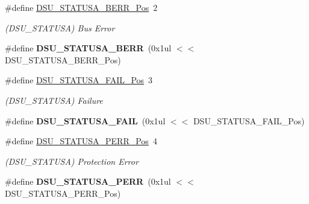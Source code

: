 \begin{DoxyCompactItemize}
\item 
\hypertarget{group___s_a_m_l21___d_s_u_gafa02b78e838184c6f5a895f0f16c213a}{}\#define \hyperlink{group___s_a_m_l21___d_s_u_gafa02b78e838184c6f5a895f0f16c213a}{D\+S\+U\+\_\+\+S\+T\+A\+T\+U\+S\+A\+\_\+\+B\+E\+R\+R\+\_\+\+Pos}~2\label{group___s_a_m_l21___d_s_u_gafa02b78e838184c6f5a895f0f16c213a}

\begin{DoxyCompactList}\small\item\em (D\+S\+U\+\_\+\+S\+T\+A\+T\+U\+S\+A) Bus Error \end{DoxyCompactList}\item 
\hypertarget{group___s_a_m_l21___d_s_u_ga74dbd3779decac8f909b6f2fde2df451}{}\#define {\bfseries D\+S\+U\+\_\+\+S\+T\+A\+T\+U\+S\+A\+\_\+\+B\+E\+R\+R}~(0x1ul $<$$<$ D\+S\+U\+\_\+\+S\+T\+A\+T\+U\+S\+A\+\_\+\+B\+E\+R\+R\+\_\+\+Pos)\label{group___s_a_m_l21___d_s_u_ga74dbd3779decac8f909b6f2fde2df451}

\item 
\hypertarget{group___s_a_m_l21___d_s_u_ga379cd81ca596d64fff4cdf4cd0642e9d}{}\#define \hyperlink{group___s_a_m_l21___d_s_u_ga379cd81ca596d64fff4cdf4cd0642e9d}{D\+S\+U\+\_\+\+S\+T\+A\+T\+U\+S\+A\+\_\+\+F\+A\+I\+L\+\_\+\+Pos}~3\label{group___s_a_m_l21___d_s_u_ga379cd81ca596d64fff4cdf4cd0642e9d}

\begin{DoxyCompactList}\small\item\em (D\+S\+U\+\_\+\+S\+T\+A\+T\+U\+S\+A) Failure \end{DoxyCompactList}\item 
\hypertarget{group___s_a_m_l21___d_s_u_gacfa2c317afc818826c5ee60f7fd5b06a}{}\#define {\bfseries D\+S\+U\+\_\+\+S\+T\+A\+T\+U\+S\+A\+\_\+\+F\+A\+I\+L}~(0x1ul $<$$<$ D\+S\+U\+\_\+\+S\+T\+A\+T\+U\+S\+A\+\_\+\+F\+A\+I\+L\+\_\+\+Pos)\label{group___s_a_m_l21___d_s_u_gacfa2c317afc818826c5ee60f7fd5b06a}

\item 
\hypertarget{group___s_a_m_l21___d_s_u_ga2d5f7f64db290d822709d358b9d8baf6}{}\#define \hyperlink{group___s_a_m_l21___d_s_u_ga2d5f7f64db290d822709d358b9d8baf6}{D\+S\+U\+\_\+\+S\+T\+A\+T\+U\+S\+A\+\_\+\+P\+E\+R\+R\+\_\+\+Pos}~4\label{group___s_a_m_l21___d_s_u_ga2d5f7f64db290d822709d358b9d8baf6}

\begin{DoxyCompactList}\small\item\em (D\+S\+U\+\_\+\+S\+T\+A\+T\+U\+S\+A) Protection Error \end{DoxyCompactList}\item 
\hypertarget{group___s_a_m_l21___d_s_u_ga0d09a64d9359e44b57ebd1734163e059}{}\#define {\bfseries D\+S\+U\+\_\+\+S\+T\+A\+T\+U\+S\+A\+\_\+\+P\+E\+R\+R}~(0x1ul $<$$<$ D\+S\+U\+\_\+\+S\+T\+A\+T\+U\+S\+A\+\_\+\+P\+E\+R\+R\+\_\+\+Pos)\label{group___s_a_m_l21___d_s_u_ga0d09a64d9359e44b57ebd1734163e059}


\end{DoxyCompactItemize}
